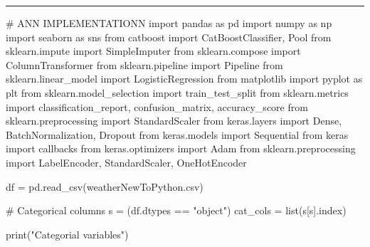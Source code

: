 \documentclass[
  letterpaper,
  DIV=11,
  numbers=noendperiod]{scrartcl}
\newenvironment{Shaded}{\begin{snugshade}}{\end{snugshade}}
\newcommand{\BuiltInTok}[1]{\textcolor[rgb]{0.00,0.23,0.31}{#1}}
\newcommand{\CommentTok}[1]{\textcolor[rgb]{0.37,0.37,0.37}{#1}}
\newcommand{\ImportTok}[1]{\textcolor[rgb]{0.00,0.46,0.62}{#1}}
\newcommand{\NormalTok}[1]{\textcolor[rgb]{0.00,0.23,0.31}{#1}}
\newcommand{\OperatorTok}[1]{\textcolor[rgb]{0.37,0.37,0.37}{#1}}
\newcommand{\StringTok}[1]{\textcolor[rgb]{0.13,0.47,0.30}{#1}}
\begin{document}
\begin{center}\rule{0.5\linewidth}{0.5pt}\end{center}

\begin{Shaded}
\begin{Highlighting}[]
\CommentTok{\# ANN IMPLEMENTATIONN}
\ImportTok{import}\NormalTok{ pandas }\ImportTok{as}\NormalTok{ pd}
\ImportTok{import}\NormalTok{ numpy }\ImportTok{as}\NormalTok{ np}
\ImportTok{import}\NormalTok{ seaborn }\ImportTok{as}\NormalTok{ sns}
\ImportTok{from}\NormalTok{ catboost }\ImportTok{import}\NormalTok{ CatBoostClassifier, Pool}
\ImportTok{from}\NormalTok{ sklearn.impute }\ImportTok{import}\NormalTok{ SimpleImputer}
\ImportTok{from}\NormalTok{ sklearn.compose }\ImportTok{import}\NormalTok{ ColumnTransformer}
\ImportTok{from}\NormalTok{ sklearn.pipeline }\ImportTok{import}\NormalTok{ Pipeline}
\ImportTok{from}\NormalTok{ sklearn.linear\_model }\ImportTok{import}\NormalTok{ LogisticRegression}
\ImportTok{from}\NormalTok{ matplotlib }\ImportTok{import}\NormalTok{ pyplot }\ImportTok{as}\NormalTok{ plt}
\ImportTok{from}\NormalTok{ sklearn.model\_selection }\ImportTok{import}\NormalTok{ train\_test\_split}
\ImportTok{from}\NormalTok{ sklearn.metrics }\ImportTok{import}\NormalTok{ classification\_report, confusion\_matrix, accuracy\_score}
\ImportTok{from}\NormalTok{ sklearn.preprocessing }\ImportTok{import}\NormalTok{ StandardScaler}
\ImportTok{from}\NormalTok{ keras.layers }\ImportTok{import}\NormalTok{ Dense, BatchNormalization, Dropout}
\ImportTok{from}\NormalTok{ keras.models }\ImportTok{import}\NormalTok{ Sequential}
\ImportTok{from}\NormalTok{ keras }\ImportTok{import}\NormalTok{ callbacks}
\ImportTok{from}\NormalTok{ keras.optimizers }\ImportTok{import}\NormalTok{ Adam}
\ImportTok{from}\NormalTok{ sklearn.preprocessing }\ImportTok{import}\NormalTok{ LabelEncoder, StandardScaler, OneHotEncoder}

\NormalTok{df }\OperatorTok{=}\NormalTok{ pd.read\_csv(}\StringTok{\textquotesingle{}weatherNewToPython.csv\textquotesingle{}}\NormalTok{)}

\CommentTok{\# Categorical columns}
\NormalTok{s }\OperatorTok{=}\NormalTok{ (df.dtypes }\OperatorTok{==} \StringTok{"object"}\NormalTok{)}
\NormalTok{cat\_cols }\OperatorTok{=} \BuiltInTok{list}\NormalTok{(s[s].index)}

\BuiltInTok{print}\NormalTok{(}\StringTok{"Categorial variables"}\NormalTok{)}
\end{Highlighting}
\end{Shaded}
\end{document}
